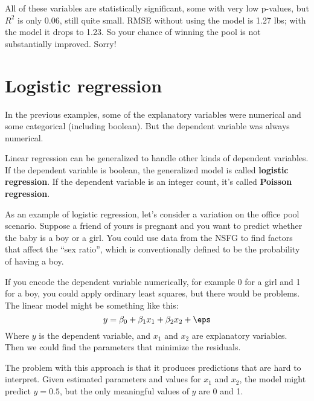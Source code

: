 \documentclass[12pt]{book}
\begin{document}
All of these variables are statistically significant, some with
very low p-values, but 
$R^2$ is only 0.06, still quite small.
RMSE without using the model is 1.27 lbs; with the model it drops
to 1.23.  So your chance of winning the pool is not substantially
improved.  Sorry!
   



\section{Logistic regression}

In the previous examples, some of the explanatory variables were
numerical and some categorical (including boolean).  But the dependent
variable was always numerical.

Linear regression can be generalized to handle other kinds of
dependent variables.  If the dependent variable is boolean, the
generalized model is called {\bf logistic regression}.  If the dependent
variable is an integer count, it's called {\bf Poisson
regression}.

As an example of logistic regression, let's consider a variation
on the office pool scenario.
Suppose
a friend of yours is pregnant and you want to predict whether the
baby is a boy or a girl.  You could use data from the NSFG to find
factors that affect the ``sex ratio'', which is conventionally
defined to be the probability
of having a boy.

If you encode the dependent variable numerically, for example 0 for a
girl and 1 for a boy, you could apply ordinary least squares, but
there would be problems.  The linear model might be something like
this:
%
\[ y = \beta_0 + \beta_1 x_1 + \beta_2 x_2 + \eps \]
%
Where $y$ is the dependent variable, and $x_1$ and $x_2$ are
explanatory variables.  Then we could find the parameters that
minimize the residuals.

The problem with this approach is that it produces predictions that
are hard to interpret.  Given estimated parameters and values for
$x_1$ and $x_2$, the model might predict $y=0.5$, but the only
meaningful values of $y$ are 0 and 1.
\end{document}
